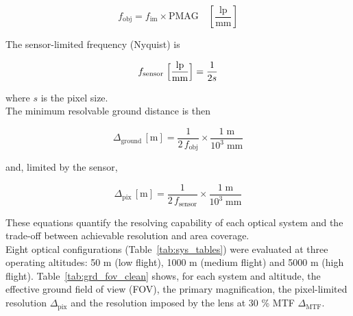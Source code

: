 \begin{equation}
    f_{\text{obj}} = f_{\text{im}} \times \text{PMAG}
    \quad\left[\frac{\text{lp}}{\text{mm}}\right]
    \label{eq:f_obj_"}
\end{equation}

\noindent The sensor-limited frequency (Nyquist) is

\begin{equation}
    f_{\text{sensor}}\;\Bigl[\frac{\text{lp}}{\text{mm}}\Bigr] = \frac{1}{2s}
    \label{eq:sensor_res}
\end{equation}

where \(s\) is the pixel size.\\ 

\noindent The minimum resolvable ground distance is then

\begin{equation}
    \Delta_{\text{ground}}\,[\text{m}] =
    \frac{1}{2\,f_{\text{obj}}}\times
    \frac{1\;\text{m}}{10^{3}\;\text{mm}}
    \label{eq:delta_ground}
\end{equation}

 and, limited by the sensor,

\begin{equation}
  \Delta_{\text{pix}}\,[\text{m}] =
  \frac{1}{2\,f_{\text{sensor}}}\times
  \frac{1\;\text{m}}{10^{3}\;\text{mm}}
  \label{eq:delta_ground_sensor}
\end{equation}

\noindent These equations quantify the resolving capability of each optical
system and the trade-off between achievable resolution and area
coverage.\\

\noindent Eight optical configurations (Table~\ref{tab:sys_tables}) were evaluated
at three operating altitudes: 50 m (low flight), 1000 m (medium flight)
and 5000 m (high flight).  Table~\ref{tab:grd_fov_clean} shows, for each
system and altitude, the effective ground field of view (FOV), the
primary magnification, the pixel-limited resolution
\(\Delta_{\mathrm{pix}}\) and the resolution imposed by the lens at
30 \% MTF \(\Delta_{\mathrm{MTF}}\).\\

